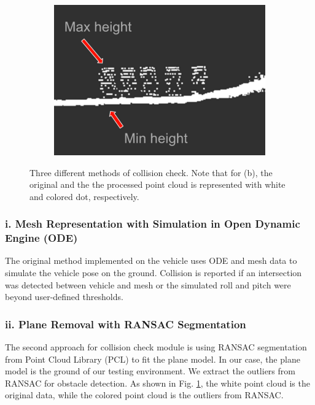 \documentclass[../thesis.tex]{subfiles}
\begin{document}
\begin{figure}[t]
\begin{subfigure}[b]{0.3\linewidth}
		\label{fig:collision_ransac}
	\end{subfigure}
	\begin{subfigure}[b]{0.3\linewidth}
		\includegraphics[width=\columnwidth]{./RRTPlanner/fig/height_map.png}
		\label{fig:collision_height_map}
	\end{subfigure}
	\caption{Three different methods of collision check. Note that for (b), the original and the the processed point cloud is represented with white and colored dot, respectively.}
    \label{fig:collision}
\end{figure}


\subsubsection{i. Mesh Representation with Simulation in Open Dynamic Engine (ODE) \cite{wettergreen2012developing}}
The original method implemented on the vehicle uses ODE and mesh data to simulate the vehicle pose on the ground. Collision is reported if an intersection was detected between vehicle and mesh or the simulated roll and pitch were beyond user-defined thresholds. 

\subsubsection{ii. Plane Removal with RANSAC Segmentation \cite{fischler1981random}}
The second approach for collision check module is using RANSAC segmentation from Point Cloud Library (PCL) to fit the plane model. In our case, the plane model is the ground of our testing environment. We extract the outliers from RANSAC for obstacle detection. As shown in Fig. \ref{fig:collision_ransac}, the white point cloud is the original data, while the colored point cloud is the outliers from RANSAC. 
\end{document}
